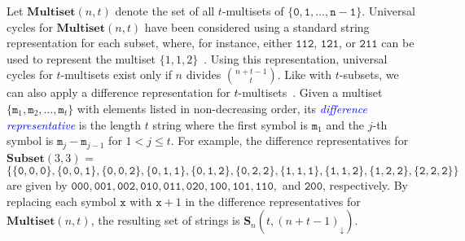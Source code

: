 \documentclass[US-letter,USenglish,authorcolumns,autoref]{lipics-v2021}
\renewcommand{\tt} {\mathtt}
\newcommand{\bS}{\mathbf{S}}
\newcommand{\defo}[1] {\emph{\textcolor{blue}{#1}}}
\begin{document}
Let $\mathbf{Multiset}(n,t)$ denote the set of all $t$-multisets of $ \{\tt{0,1,\ldots, n-1}\}$.  
Universal cycles for $\mathbf{Multiset}(n,t)$  have been considered using a standard string representation for each subset, where, for instance, either $\tt{112}$, $\tt{121}$, or $\tt{211}$ can be used to represent the multiset $\{1,1,2\}$~\cite{jackson,hurlbert2009}.  Using this representation, universal cycles for $t$-multisets exist only if $n$ divides ${n+t-1 \choose t}$.  Like with $t$-subsets, 
we can also apply a difference representation for $t$-multisets~\cite{difference}.   Given a multiset
$\{\tt{m}_1, \tt{m}_2, \ldots , \tt{m}_t\}$ with elements listed in non-decreasing order, its \defo{difference representative} is the length $t$ string where the first symbol is $\tt{m}_1$ and the $j$-th symbol is  $\tt{m}_j - \tt{m}_{j-1}$ for $1 < j \leq t$.
For example, the difference representatives for 
 $\mathbf{Subset}(3,3)$ = \[ \{ \tt{\{0,0,0\}, \{0,0,1\}, \{0,0,2\}, \{0,1,1\}, \{0,1,2\}, \{0,2,2\}, \{1,1,1\}, \{1,1,2\}, \{1,2,2\}, \{2,2,2\}} \}\] 
 are given by
$\tt{000, 001, 002, 010, 011, 020, 100, 101, 110},$ and $\tt{200}$, respectively.  By replacing each symbol $\tt{x}$ with $\tt{x}+1$ in the difference representatives for $\mathbf{Multiset}(n,t)$, the resulting set of strings is $\bS_{n}(t,(n{+}t{-}1)_\downarrow)$.





\end{document}
